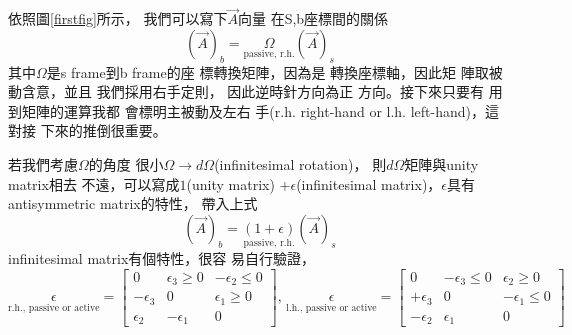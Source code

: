 \documentclass[12pt,a4paper]{article}
\begin{document}
\bigskip 依照圖\ref{firstfig}所示，%
我們可以寫下$\vec{A}$向量%
在S,b座標間的關係%
\begin{equation*}
\left( \vec{A}\right) _{b}=\underset{\text{passive, r.h.}}{\Omega }\left( 
\vec{A}\right) _{s}
\end{equation*}%
其中$\Omega $是s frame到b frame的座%
標轉換矩陣，因為是%
轉換座標軸，因此矩%
陣取被動含意，並且%
我們採用右手定則，%
因此逆時針方向為正%
方向。接下來只要有%
用到矩陣的運算我都%
會標明主被動及左右%
手(r.h. right-hand or l.h. left-hand)，這對接%
下來的推倒很重要。

若我們考慮$\Omega $的角度%
很小$\Omega \rightarrow d\Omega $(infinitesimal rotation)，%
則$d\Omega $矩陣與unity matrix相去%
不遠，可以寫成$1$(unity matrix) +$%
\epsilon $(infinitesimal matrix)，$\epsilon $具有%
antisymmetric matrix的特性\cite[p. 169]{goldstein}，%
帶入上式%
\begin{equation*}
\left( \vec{A}\right) _{b}=\underset{\text{passive, r.h.}}{\left( 1+\epsilon
\right) }\left( \vec{A}\right) _{s}
\end{equation*}%
infinitesimal matrix有個特性，很容%
易自行驗證，%
\begin{equation*}
\underset{\text{r.h., passive or active}}{\epsilon }=\left[ 
\begin{array}{ccc}
0 & \epsilon _{3}\geq 0 & -\epsilon _{2}\leq 0 \\ 
-\epsilon _{3} & 0 & \epsilon _{1}\geq 0 \\ 
\epsilon _{2} & -\epsilon _{1} & 0%
\end{array}%
\right] \text{, }\underset{\text{l.h., passive or active}}{\epsilon }=\left[ 
\begin{array}{ccc}
0 & -\epsilon _{3}\leq 0 & \epsilon _{2}\geq 0 \\ 
+\epsilon _{3} & 0 & -\epsilon _{1}\leq 0 \\ 
-\epsilon _{2} & \epsilon _{1} & 0%
\end{array}%
\right]
\end{equation*}
\end{document}
